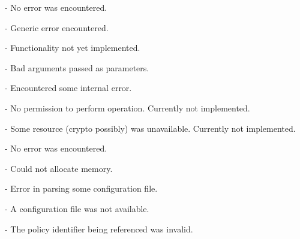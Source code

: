 \begin{description}

\item {}

\begin{description}

\item {} - No error was encountered.

\item {} - Generic error encountered.

\item {} - Functionality not yet implemented.

\item {} - Bad arguments passed as parameters.

\item {} - Encountered some internal error.

\item {} - No permission to perform operation.
Currently not implemented.

\item {} - Some resource (crypto possibly) was
unavailable.  Currently not implemented.

\end{description}

\item {}

\begin{description}

\item {} - No error was encountered.

\item {} - Could not allocate memory.

\item {} - Error in parsing some configuration
file.

\item {} - A configuration file was not available.

\item {} - The policy identifier being referenced was
invalid.

\end{description}

\end{description}

